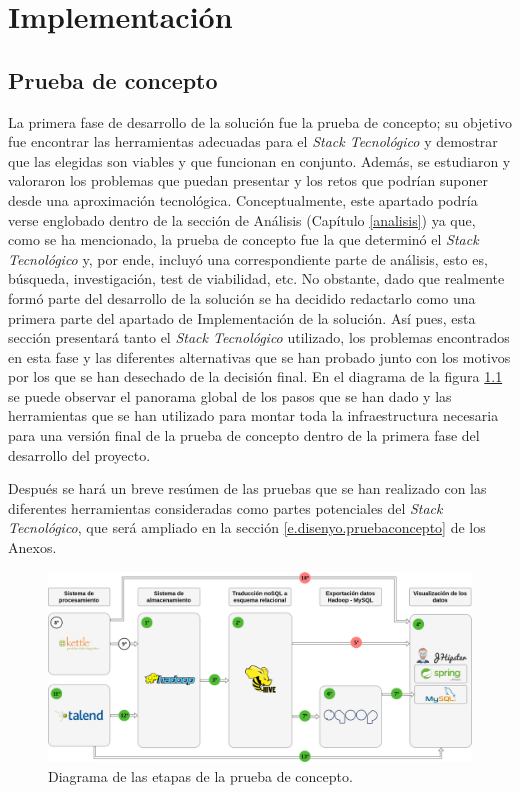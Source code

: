 \chapter{Implementación} \label{implementacion}
\section{Prueba de concepto} \label{implementacion.prueba}

La primera fase de desarrollo de la solución fue la prueba de concepto; su objetivo fue encontrar las herramientas adecuadas para el \textit{Stack Tecnológico} y demostrar que las elegidas son viables y que funcionan en conjunto. Además, se estudiaron y valoraron los problemas que puedan presentar y los retos que podrían suponer desde una aproximación tecnológica. Conceptualmente, este apartado podría verse englobado dentro de la sección de Análisis (Capítulo \ref{analisis}) ya que, como se ha mencionado, la prueba de concepto fue la que determinó el \textit{Stack Tecnológico} y, por ende, incluyó una correspondiente parte de análisis, esto es, búsqueda, investigación, test de viabilidad, etc. No obstante, dado que realmente formó parte del desarrollo de la solución se ha decidido redactarlo como una primera parte del apartado de Implementación de la solución. Así pues, esta sección presentará tanto el \textit{Stack Tecnológico} utilizado, los problemas encontrados en esta fase y las diferentes alternativas que se han probado junto con los motivos por los que se han desechado de la decisión final. En el diagrama de la figura \ref{fig:pruebaconceptoglobal} se puede observar el panorama global de los pasos que se han dado y las herramientas que se han utilizado para montar toda la infraestructura necesaria para una versión final de la prueba de concepto dentro de la primera fase del desarrollo del proyecto. 
\par Después se hará un breve resúmen de las pruebas que se han realizado con las diferentes herramientas consideradas como partes potenciales del \textit{Stack Tecnológico}, que será ampliado en la sección \ref{e.disenyo.pruebaconcepto} de los Anexos.
\begin{landscape}

\begin{figure}[p!]
    
    \includegraphics[width=\linewidth]{Imagenes/pruebadeconceptoglobal}
    \caption{Diagrama de las etapas de la prueba de concepto.}
    \label{fig:pruebaconceptoglobal}
\end{figure}

\end{landscape}


